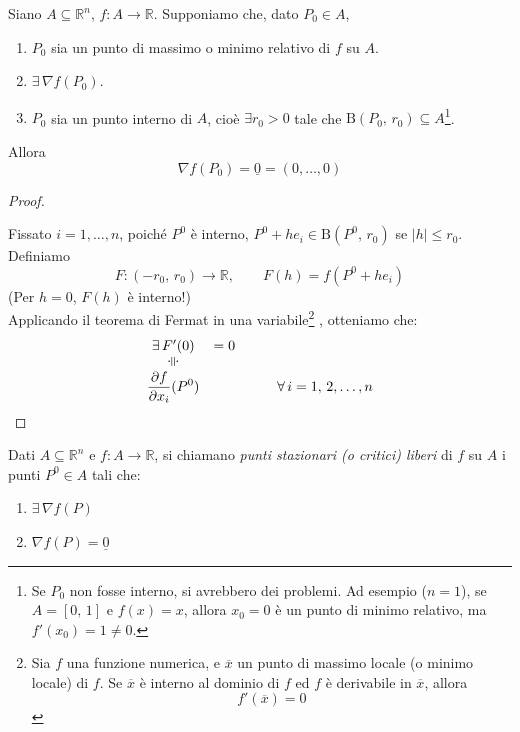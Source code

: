 \begin{thm}[di Fermat]
Siano $A \subseteq \mathbb{R}^n$, $f : A \longrightarrow \mathbb{R}$. Supponiamo che, dato $P_0 \in A$,
\begin{enumerate}[labelindent=\parindent,leftmargin=*,label=\textnormal{(\roman*)},start=1]
\item $P_0$ sia un punto di massimo o minimo relativo di $f$ su $A$.
\item $\exists \, \nabla f(P_0)$.
\item $P_0$ sia un punto interno di $A$, cioè $\exists r_0 > 0$ tale che $\mathrm{B}(P_0,\,r_0) \subseteq A$\footnote{Se $P_0$ non fosse interno, si avrebbero dei problemi. Ad esempio ($n=1$), se $A=[0,\,1]$ e $f(x)=x$, allora $x_0=0$ è un punto di minimo relativo, ma $f'(x_0) = 1 \neq 0$.}.
\end{enumerate}
Allora
$$\nabla f(P_0) = \underline{0} = (0,\ldots,0)$$
\end{thm}
\begin{proof}
\begin{center}
\def\svgwidth{8cm}

\end{center}
Fissato $i=1,\ldots,n$, poiché $P^0$ è interno, $P^0 + he_i \in \mathrm{B}(P^0,\,r_0)$ se $|h| \leq r_0$. Definiamo
$$
F : (-r_0,\,r_0) \longrightarrow \mathbb{R}, \qquad F(h) = f(P^0+he_i)
$$
(Per $h=0$, $F(h)$ è interno!)\\
Applicando il teorema di Fermat in una variabile\footnote{
\cite{Greco2012}
Sia $f$ una funzione numerica, e $\overline{x}$ un punto di massimo locale (o minimo locale) di $f$. Se $\overline{x}$ è interno al dominio di $f$ ed $f$ è derivabile in $\overline{x}$, allora
$$f'(\overline{x}) = 0$$
}
, otteniamo che:
$$
\begin{array}{ccc}
\exists \, F'(0) &= 0 & \\
\rotatebox{90}{$\doteqdot$} & & \\
\displaystyle \frac{\partial f}{\partial x_i} (P^0) & & \qquad \forall \, i = 1,\,2,\ldots,n \\
\end{array}
$$
\end{proof}

\begin{definition}
Dati $A \subseteq \mathbb{R}^n$ e $f : A \longrightarrow \mathbb{R}$, si chiamano \emph{punti stazionari (o critici) liberi} di $f$ su $A$ i punti $P^0 \in A$ tali che:
\begin{enumerate}[labelindent=\parindent,leftmargin=*,label=\textnormal{(S\arabic*)},start=1]
\item $\exists \, \nabla f(P)$
\item $\nabla f(P) = \underline{0}$
\end{enumerate}
\end{definition}

